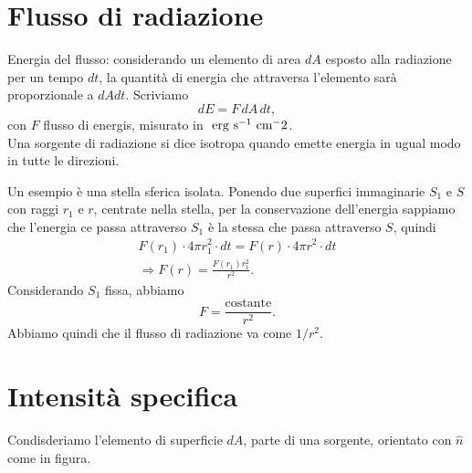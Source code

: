 \section{Flusso di radiazione}
Energia del flusso: considerando un elemento di area $dA$ esposto alla radiazione per un tempo $dt$, la quantità di energia che attraversa l'elemento sarà proporzionale a $dAdt$. Scriviamo
\begin{equation}
    dE=F\,dA\,dt,
    \label{001}
\end{equation}
con $F$ flusso di energis, misurato in $\text{ erg}\text{ s}^{-1}\text{ cm}^-2$.\\
Una sorgente di radiazione si dice isotropa quando emette energia in ugual modo in tutte le direzioni.
\begin{wrapfigure}{r}{0pt}
    \centering
\end{wrapfigure}
 Un esempio è una stella sferica isolata. Ponendo due superfici immaginarie $S_1$ e $S$ con raggi $r_1$ e $r$, centrate nella stella, per la conservazione dell'energia sappiamo che l'energia ce passa attraverso $S_1$ è la stessa che passa attraverso $S$, quindi
\begin{gather*}
    F(r_1)\cdot 4\pi r_1^2\cdot dt = F(r)\cdot 4\pi r^2\cdot dt\\
    \Rightarrow F(r) = \frac{F(r_1)r_1^2}{r^2}.
\end{gather*}
Considerando $S_1$ fissa, abbiamo
\begin{equation*}
    F=\frac{\text{costante}}{r^2}.
\end{equation*}
Abbiamo quindi che il flusso di radiazione va come $1/r^2$.

\section{Intensità specifica}
Condisderiamo l'elemento di superficie $dA$, parte di una sorgente, orientato con $\hat{n}$ come in figura. 


